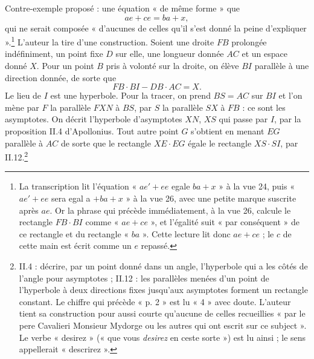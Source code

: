 \documentclass[11pt,a4paper]{article}
\begin{document}
Contre-exemple proposé : une équation « de même forme » que
\[
ae+ce=ba+x ,
\]
qui ne serait composée « d'aucunes de celles qu'il s'est donné la peine
d'expliquer ».\footnote{La transcription lit l'équation « \(ae'+ee\) egale
\(ba+x\) » à la vue 24, puis « \(ae'+ee\) sera egal a \(+ba+x\) » à la vue 26,
avec une petite marque suscrite après \(ae\). Or la phrase qui précède
immédiatement, à la vue 26, calcule le rectangle \(FB\cdot BI\) comme
« \(ae+ce\) », et l'égalité suit « par conséquent » de ce rectangle et du
rectangle « \(ba\) ». Cette lecture lit donc \(ae+ce\) ; le \(c\) de cette main
est écrit comme un \(e\) repassé.} L'auteur la tire d'une construction.
Soient une droite \(FB\) prolongée indéfiniment, un point fixe \(D\) sur elle,
une longueur donnée \(AC\) et un espace donné \(X\). Pour un point \(B\) pris à
volonté sur la droite, on élève \(BI\) parallèle à une direction donnée, de
sorte que
\[
FB\cdot BI - DB\cdot AC = X .
\]
Le lieu de \(I\) est une hyperbole. Pour la tracer, on prend \(BS=AC\) sur
\(BI\) et l'on mène par \(F\) la parallèle \(FXN\) à \(BS\), par \(S\) la
parallèle \(SX\) à \(FB\) : ce sont les asymptotes. On décrit l'hyperbole
d'asymptotes \(XN\), \(XS\) qui passe par \(I\), par la proposition II.4
d'Apollonius. Tout autre point \(G\) s'obtient en menant \(EG\) parallèle à
\(AC\) de sorte que le rectangle \(XE\cdot EG\) égale le rectangle
\(XS\cdot SI\), par II.12.\footnote{II.4 : décrire, par un point donné
dans un angle, l'hyperbole qui a les côtés de l'angle pour asymptotes ; II.12 :
les parallèles menées d'un point de l'hyperbole à deux directions fixes
jusqu'aux asymptotes forment un rectangle constant. Le chiffre qui précède
« p. 2 » est lu « 4 » avec doute. L'auteur tient sa construction pour aussi
courte qu'aucune de celles recueillies « par le pere Cavalieri Monsieur Mydorge
ou les autres qui ont escrit sur ce subject ». Le verbe « desirez » (« que vous
\emph{desirez} en ceste sorte ») est lu ainsi ; le sens appellerait
« descrirez ».}
\end{document}
